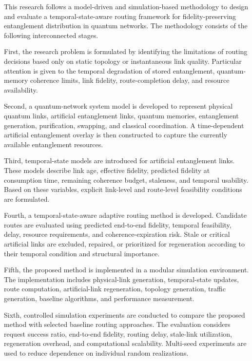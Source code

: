 This research follows a model-driven and simulation-based methodology to design and evaluate a temporal-state-aware routing framework for fidelity-preserving entanglement distribution in quantum networks. The methodology consists of the following interconnected stages.

First, the research problem is formulated by identifying the limitations of routing decisions based only on static topology or instantaneous link quality. Particular attention is given to the temporal degradation of stored entanglement, quantum-memory coherence limits, link fidelity, route-completion delay, and resource availability.

Second, a quantum-network system model is developed to represent physical quantum links, artificial entanglement links, quantum memories, entanglement generation, purification, swapping, and classical coordination. A time-dependent artificial entanglement overlay is then constructed to capture the currently available entanglement resources.

Third, temporal-state models are introduced for artificial entanglement links. These models describe link age, effective fidelity, predicted fidelity at consumption time, remaining coherence budget, staleness, and temporal usability. Based on these variables, explicit link-level and route-level feasibility conditions are formulated.

Fourth, a temporal-state-aware adaptive routing method is developed. Candidate routes are evaluated using predicted end-to-end fidelity, temporal feasibility, delay, resource requirements, and coherence-expiration risk. Stale or critical artificial links are excluded, repaired, or prioritized for regeneration according to their temporal condition and structural importance.

Fifth, the proposed method is implemented in a modular simulation environment. The implementation includes physical-link generation, temporal-state updates, route computation, artificial-link regeneration, topology generation, traffic generation, baseline algorithms, and performance measurement.

Sixth, controlled simulation experiments are conducted to compare the proposed method with selected baseline routing approaches. The evaluation considers request success ratio, end-to-end fidelity, routing delay, stale-link utilization, regeneration overhead, and computational scalability. Multi-seed experiments are used to reduce dependence on individual random realizations.

